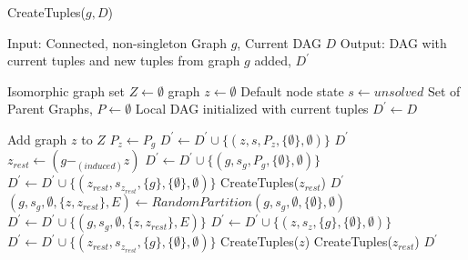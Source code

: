 \begin{algorithm}
\caption{CreateTuples($g,D$)} 
\label{alg:alg02}
\begin{algorithmic}
\STATE Input: Connected, non-singleton Graph $g$, Current DAG $D$
\STATE Output: DAG with current tuples and new tuples from graph $g$ added, $D^{'}$
\end{algorithmic}
\begin{algorithmic}[1]
\STATE Isomorphic graph set $Z \leftarrow \emptyset$
\STATE graph $z  \leftarrow　\emptyset$
\STATE Default node state $s  \leftarrow unsolved$
\STATE Set of Parent Graphs, $P \leftarrow \emptyset$
\STATE Local DAG initialized with current tuples $D^{'} \leftarrow D$

\STATE Add graph $z$ to $Z$ 
\ENDIF
\ENDFOR
{} 
\STATE $P_{z} \leftarrow P_{g}$
\STATE $D^{'} \leftarrow D^{'} \cup \{(z,s,P_z ,\{\emptyset \} ,\emptyset)\}$
\RETURN $D^{'}$
\ELSE
{}
\STATE \ $z_{rest}  \leftarrow  (g -_{(induced)} z)$
\STATE $D^{'}  \leftarrow D^{'} \cup \{(g,s_{g},P_g,\{ \emptyset \} , \emptyset )\}$
\STATE $D^{'}  \leftarrow D^{'} \cup \{(z_{rest},s_{z_{rest}},\{g\},\{\emptyset \} , \emptyset )\}$
\STATE CreateTuples($z_{rest}$)
\RETURN  $D^{'}$
\ENDIF
\ENDFOR
\ENDIF
\ENDWHILE
\STATE  $(g,s_{g},\emptyset,\{z,z_{rest}\},E) \leftarrow RandomPartition(g,s_{g},\emptyset,\{\emptyset \}, \emptyset )$
\STATE $D^{'}  \leftarrow D^{'} \cup \{(g,s_{g},\emptyset,\{z,z_{rest}\},E)\}$
\STATE $D^{'}  \leftarrow D^{'} \cup \{(z,s_{z},\{g\},\{ \emptyset \}, \emptyset )\}$
\STATE $D^{'}  \leftarrow D^{'} \cup \{(z_{rest},s_{z_{rest}},\{g\}, \{ \emptyset \} , \emptyset )\}$
\STATE CreateTuples($z$)
\STATE CreateTuples($z_{rest}$) 
\RETURN $D^{'}$
\end{algorithmic}
\end{algorithm}


